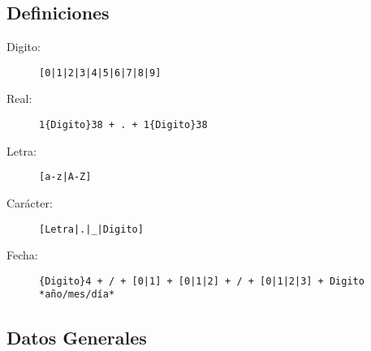 \subsection{Definiciones}
\begin{description}
\item [Digito:]{
\begin{lstlisting}
[0|1|2|3|4|5|6|7|8|9]\end{lstlisting}
}
\item [Real:]{
\begin{lstlisting}
1{Digito}38 + . + 1{Digito}38\end{lstlisting}
}
\item [Letra:]{
\begin{lstlisting}
[a-z|A-Z]\end{lstlisting}
}
\item [Carácter:]{
\begin{lstlisting}
[Letra|.|_|Digito]\end{lstlisting}
}
\item [Fecha:]{
\begin{lstlisting}
{Digito}4 + / + [0|1] + [0|1|2] + / + [0|1|2|3] + Digito *año/mes/día*\end{lstlisting}
}
\end{description}

\subsection{Datos Generales}

